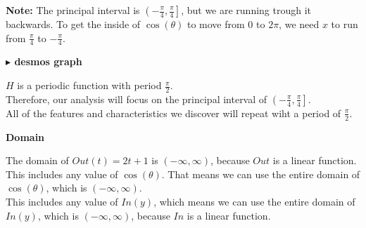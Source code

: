 \documentclass{ximera}
\begin{document}
\textbf{Note:}  The principal interval is $\left( -\frac{\pi}{4}, \frac{\pi}{4} \right]$, but we are running trough it backwards.  To get the inside of $\cos(\theta)$ to move from $0$ to $2\pi$, we need $x$ to run from $\frac{\pi}{4}$ to $-\frac{\pi}{4}$.












\textbf{\textcolor{blue!55!black}{$\blacktriangleright$ desmos graph}} 
\begin{center}
\end{center}












\begin{observation}

$H$ is a periodic function with period $\frac{\pi}{2}$. \\


Therefore, our analysis will focus on the principal interval of $\left( -\frac{\pi}{4}, \frac{\pi}{4} \right]$. \\


All of the features and characteristics we discover will repeat wiht a period of $\frac{\pi}{2}$.\\


\end{observation}














\textbf{\textcolor{blue!55!black}{Domain}}


The domain of $Out(t) = 2t + 1$ is $(-\infty, \infty)$, because $Out$ is a linear function.  \\

This includes any value of $\cos(\theta)$. That means we can use the entire domain of $\cos(\theta)$, which is $(-\infty, \infty)$.  \\


This includes any value of $In(y)$, which means we can use the entire domain of $In(y)$, which is $(-\infty, \infty)$, because $In$ is a linear function.  \\
\end{document}
